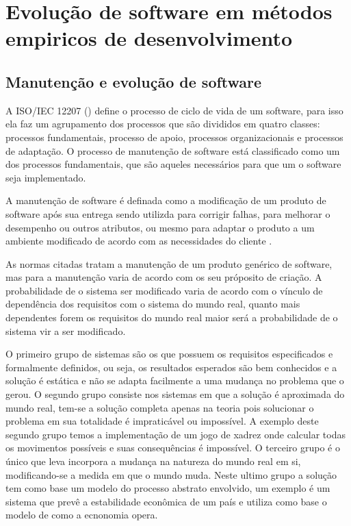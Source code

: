 \chapter{Evolução de software em métodos empiricos de desenvolvimento}
\label{cap-evol-software}

\section{Manutenção e evolução de software}
\label{sect-manut-evol-soft}

A ISO/IEC 12207 (\citeyear{iso12207}) define o processo de ciclo de vida de um software, para isso ela faz um agrupamento dos processos que são divididos em quatro classes: processos fundamentais, processo de apoio, processos organizacionais e processos de adaptação. O processo de manutenção de software está classificado como um dos processos fundamentais, que são aqueles necessários para que um o software seja implementado.

A manutenção de software é definada como a modificação de um produto de software após sua entrega sendo utilizda para corrigir falhas, para melhorar o desempenho ou outros atributos, ou mesmo para adaptar o produto a um ambiente modificado de acordo com as necessidades do cliente \cite{ieee1219}.

As normas citadas tratam a manutenção de um produto genérico de software, mas para \cite[p.~380]{pfleeger2004engenharia} a manutenção varia de acordo com os seu próposito de criação. A probabilidade de o sistema ser modificado varia de acordo com o vínculo de dependência dos requisitos com o sistema do mundo real, quanto mais dependentes forem os requisitos do mundo real maior será a probabilidade de o sistema vir a ser modificado.

O primeiro grupo de sistemas são os que possuem os requisitos especificados e formalmente definidos, ou seja, os resultados esperados são bem conhecidos e a solução é estática e não se adapta facilmente a uma mudança no problema que o gerou. O segundo grupo consiste nos sistemas em que a solução é aproximada do mundo real, tem-se a solução completa apenas na teoria pois solucionar o problema em sua totalidade é impraticável ou impossível. A exemplo deste segundo grupo temos a implementação de um jogo de xadrez onde calcular todas os movimentos possíveis e suas consequências é impossível. O terceiro grupo é o único que leva incorpora a mudança na natureza do mundo real em si,  modificando-se a medida em que o mundo muda. Neste ultimo grupo a solução tem como base um modelo do processo abstrato envolvido, um exemplo é um sistema que prevê a estabilidade econômica de um país e utiliza como base o modelo de como a ecnonomia opera.


